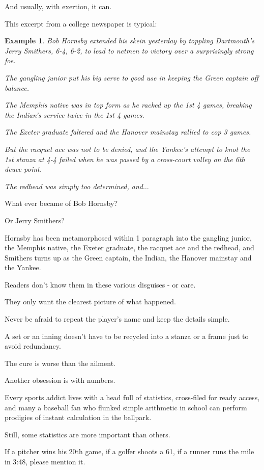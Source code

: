\documentclass{book}
\numberwithin{equation}{section}
\newtheorem{example}{Example}[chapter]
\begin{document}
And usually, with exertion, it can.

This excerpt from a college newspaper is typical:
\begin{example}
    Bob Hornsby extended his skein yesterday by toppling Dartmouth's Jerry Smithers, 6-4, 6-2, to lead to netmen to victory over a surprisingly strong foe.
    
    The gangling junior put his big serve to good use in keeping the Green captain off balance.
    
    The Memphis native was in top form as he racked up the 1st 4 games, breaking the Indian's service twice in the 1st 4 games.
    
    The Exeter graduate faltered and the Hanover mainstay rallied to cop 3 games.
    
    But the racquet ace was not to be denied, and the Yankee's attempt to knot the 1st stanza at 4-4 failed when he was passed by a cross-court volley on the 6th deuce point.
    
    The redhead was simply too determined, and$\ldots$
\end{example}
What ever became of Bob Hornsby?

Or Jerry Smithers?

Hornsby has been metamorphosed within 1 paragraph into the gangling junior, the Memphis native, the Exeter graduate, the racquet ace and the redhead, and Smithers turns up as the Green captain, the Indian, the Hanover mainstay and the Yankee.

Readers don't know them in these various disguises - or care.

They only want the clearest picture of what happened.

Never be afraid to repeat the player's name and keep the details simple.

A set or an inning doesn't have to be recycled into a stanza or a frame just to avoid redundancy.

The cure is worse than the ailment.

%
Another obsession is with numbers.

Every sports addict lives with a head full of statistics, cross-filed for ready access, and many a baseball fan who flunked simple arithmetic in school can perform prodigies of instant calculation in the ballpark.

Still, some statistics are more important than others.

If a pitcher wins his 20th game, if a golfer shoots a 61, if a runner runs the mile in 3:48, please mention it.
\end{document}
